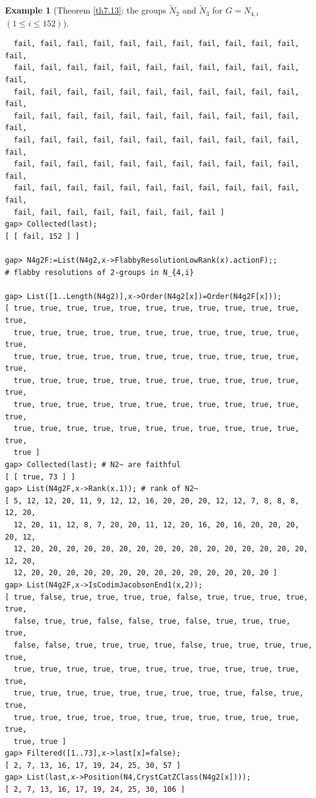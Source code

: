 \documentclass{amsart}
\theoremstyle{plain}
\theoremstyle{definition}
\newtheorem{example}[theorem]{Example}
\theoremstyle{remark}
\begin{document}
\begin{example}[Theorem \ref{th7.13}: the groups $\widetilde{N}_2$ and $\widetilde{N}_3$ for $G=N_{4,i}$ $(1\leq i\leq 152)$]
\begin{verbatim}
  fail, fail, fail, fail, fail, fail, fail, fail, fail, fail, fail, fail, 
  fail, fail, fail, fail, fail, fail, fail, fail, fail, fail, fail, fail, 
  fail, fail, fail, fail, fail, fail, fail, fail, fail, fail, fail, fail, 
  fail, fail, fail, fail, fail, fail, fail, fail, fail, fail, fail, fail, 
  fail, fail, fail, fail, fail, fail, fail, fail, fail, fail, fail, fail, 
  fail, fail, fail, fail, fail, fail, fail, fail, fail, fail, fail, fail, 
  fail, fail, fail, fail, fail, fail, fail, fail, fail, fail, fail, fail, 
  fail, fail, fail, fail, fail, fail, fail, fail ]
gap> Collected(last);
[ [ fail, 152 ] ]

gap> N4g2F:=List(N4g2,x->FlabbyResolutionLowRank(x).actionF);;
# flabby resolutions of 2-groups in N_{4,i}

gap> List([1..Length(N4g2)],x->Order(N4g2[x])=Order(N4g2F[x]));
[ true, true, true, true, true, true, true, true, true, true, true, true, 
  true, true, true, true, true, true, true, true, true, true, true, true, 
  true, true, true, true, true, true, true, true, true, true, true, true, 
  true, true, true, true, true, true, true, true, true, true, true, true, 
  true, true, true, true, true, true, true, true, true, true, true, true, 
  true, true, true, true, true, true, true, true, true, true, true, true, 
  true ]
gap> Collected(last); # N2~ are faithful
[ [ true, 73 ] ]
gap> List(N4g2F,x->Rank(x.1)); # rank of N2~
[ 5, 12, 12, 20, 11, 9, 12, 12, 16, 20, 20, 20, 12, 12, 7, 8, 8, 8, 12, 20, 
  12, 20, 11, 12, 8, 7, 20, 20, 11, 12, 20, 16, 20, 16, 20, 20, 20, 20, 12, 
  12, 20, 20, 20, 20, 20, 20, 20, 20, 20, 20, 20, 20, 20, 20, 20, 20, 12, 20, 
  12, 20, 20, 20, 20, 20, 20, 20, 20, 20, 20, 20, 20, 20, 20 ]
gap> List(N4g2F,x->IsCodimJacobsonEnd1(x,2));
[ true, false, true, true, true, true, false, true, true, true, true, true, 
  false, true, true, false, false, true, false, true, true, true, true, 
  false, false, true, true, true, true, false, true, true, true, true, true, 
  true, true, true, true, true, true, true, true, true, true, true, true, 
  true, true, true, true, true, true, true, true, true, false, true, true, 
  true, true, true, true, true, true, true, true, true, true, true, true, 
  true, true ]
gap> Filtered([1..73],x->last[x]=false);
[ 2, 7, 13, 16, 17, 19, 24, 25, 30, 57 ]
gap> List(last,x->Position(N4,CrystCatZClass(N4g2[x])));
[ 2, 7, 13, 16, 17, 19, 24, 25, 30, 106 ]


\end{verbatim}
\end{example}
\end{document}
